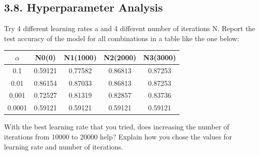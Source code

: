 \documentclass[11pt]{article}
\theoremstyle{plain}
\begin{document}
\subsection*{3.8. Hyperparameter Analysis}
Try 4 different learning rates a and 4 different number of iterations N. Report the test accuracy of the model for all combinations in a table like the one below:

\begin{table}[h]
	\centering
	\begin{tabular}{|c|c|c|c|c|}
		\hline
		\textbf{$\alpha$} & \textbf{N0(0)} & \textbf{N1(1000)} & \textbf{N2(2000)} & \textbf{N3(3000)} \\ \hline
		0.1               & 0.59121        & 0.77582           & 0.86813           & 0.87253           \\ \hline
		0.01              & 0.86154        & 0.87033           & 0.86813           & 0.87253           \\ \hline
		0.001             & 0.72527        & 0.81319           & 0.82857           & 0.83736           \\ \hline
		0.0001            & 0.59121        & 0.59121           & 0.59121           & 0.59121           \\ \hline
	\end{tabular}
\end{table}

With the best learning rate that you tried, does increasing the number of iterations from 10000 to 20000 help?  Explain how you chose the values for learning rate and number of iterations.
\end{document}
